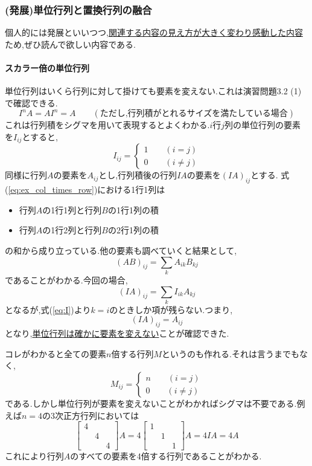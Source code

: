 \subsubsection{(発展)単位行列と置換行列の融合}\label{subsub:I_and_P}
個人的には発展といいつつ,\underline{関連する内容の見え方が大きく変わり感動した内容}ため,ぜひ読んで欲しい内容である.
\paragraph{スカラー倍の単位行列}
単位行列はいくら行列に対して掛けても要素を変えない.これは演習問題3.2 (1)で確認できる.
\[
    I^nA = AI^n = A\qquad(\text{ただし,行列積がとれるサイズを満たしている場合})
\]
これは行列積をシグマを用いて表現するとよくわかる.$i$行$j$列の単位行列の要素を$I_{ij}$とすると,
\begin{equation}
    I_{ij} = \begin{cases}
        1 \qquad(i=j)\\
        0 \qquad(i\neq j)
    \end{cases}\label{eq:I}
\end{equation}
同様に行列$A$の要素を$A_{ij}$とし,行列積後の行列$IA$の要素を$(IA)_{ij}$とする.
式(\ref{eq:ex_col_times_row})における1行1列は
\begin{itemize}
    \item 行列$A$の1行1列と行列$B$の1行1列の積
    \item 行列$A$の1行2列と行列$B$の2行1列の積
\end{itemize}
の和から成り立っている.他の要素も調べていくと結果として,
\begin{equation}
    (AB)_{ij} = \sum_k A_{ik}B_{kj} \label{eq:sum_AB}
\end{equation}
であることがわかる.今回の場合,
\[
    (IA)_{ij} = \sum_k I_{ik}A_{kj}
\]
となるが,式(\ref{eq:I})より$k=i$のときしか項が残らない.つまり,
\[
    (IA)_{ij} = A_{ij}
\]
となり,\underline{単位行列は確かに要素を変えない}ことが確認できた.

コレがわかると全ての要素$n$倍する行列$M$というのも作れる.それは言うまでもなく,
\[
    M_{ij} = \begin{cases}
        n \qquad(i=j)\\
        0 \qquad(i\neq j)
    \end{cases}
\]
である.しかし単位行列が要素を変えないことがわかればシグマは不要である.例えば$n=4$の3次正方行列においては
\[
    \begin{bmatrix}
        4 & & \\
         & 4 & \\ 
         & & 4
    \end{bmatrix}
    A = 
    4\begin{bmatrix}
        1 & & \\ & 1 & \\ && 1
    \end{bmatrix}A=
    4IA
    =4A
\]
これにより行列$A$のすべての要素を4倍する行列であることがわかる.

